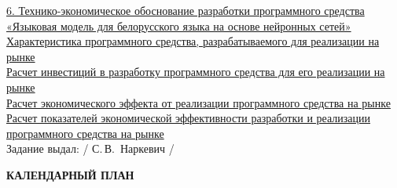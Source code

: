 {  \vspace{1em}

  \uline{\hspace*{0.2em}6. Технико-экономическое обоснование разработки программного средства \hspace*{\fill}\\\hspace*{0.2em} «Языковая модель для белорусского языка на основе нейронных сетей»\hspace*{\fill}}\\
  \uline{\hspace*{0.2em}Характеристика программного средства, разрабатываемого для реализации на \hspace*{\fill}\\\hspace*{0.2em} рынке\hspace*{\fill}}\\
  \uline{\hspace*{0.2em}Расчет инвестиций в разработку программного средства для его реализации на \hspace*{\fill}\\\hspace*{0.2em} рынке\hspace*{\fill}}\\
  \uline{\hspace*{0.2em}Расчет экономического эффекта от реализации программного средства на рынке\hspace*{\fill}} \\
  \uline{\hspace*{0.2em}Расчет показателей экономической эффективности разработки и реализации \hspace*{\fill}\\\hspace*{0.2em}программного средства на рынке\hspace*{\fill}}\\
  \hspace*{0.2em}Задание выдал: \hfill{} \uline{\hspace*{6em}} / С.\,В.~Наркевич /   

  \vspace{1em}


  \begin{center}
    \textbf{КАЛЕНДАРНЫЙ ПЛАН}
  \end{center}

}
